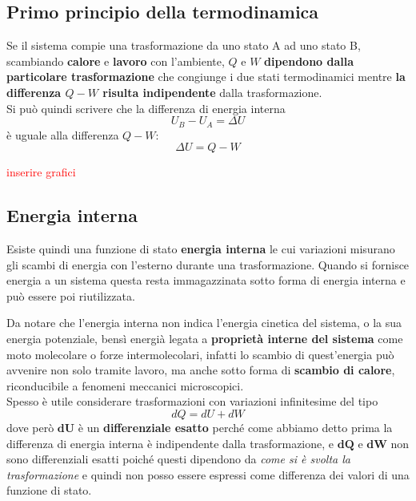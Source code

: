 \documentclass[x11names]{report}
\begin{document}
	
	\begin{center}
		\colorbox{yred}{\begin{minipage}{5.75in}
				\begin{redes}{}
					\subsection{Primo principio della termodinamica}
					Se il sistema compie una trasformazione da uno stato A ad uno stato B, scambiando \textbf{calore} e \textbf{lavoro} con l'ambiente, \(Q\) e \(W\) \textbf{dipendono dalla particolare trasformazione} che congiunge i due stati termodinamici mentre \textbf{la differenza \(Q-W\) risulta indipendente} dalla trasformazione.\\
					
					Si può quindi scrivere che la differenza di energia interna 
					\[ 
					U_B - U_A = \Delta U 
					\]
					è uguale alla differenza \(Q-W\):
					\begin{equation}\label{primoprincipio}
						\Delta U = Q -W
					\end{equation}
				\end{redes}
		\end{minipage}}
	\end{center}
	\begin{center}
		\textcolor{red}{inserire grafici}
	\end{center}
	
	\subsection{Energia interna}
	Esiste quindi una funzione di stato \textbf{energia interna} le cui variazioni misurano gli scambi di energia con l'esterno durante una trasformazione. Quando si fornisce energia a un sistema questa resta immagazzinata sotto forma di energia interna e può essere poi riutilizzata.
	
	Da notare che l'energia interna non indica l'energia cinetica del sistema, o la sua energia potenziale, bensì energià legata a \textbf{proprietà interne del sistema} come moto molecolare o forze intermolecolari, infatti lo scambio di quest'energia  può avvenire non solo tramite lavoro, ma anche sotto forma di \textbf{scambio di calore}, riconducibile a fenomeni meccanici microscopici.\\
	
	\noindent
	Spesso è utile considerare trasformazioni con variazioni infinitesime del tipo
	\[ 
	dQ = dU + dW
	\]
	dove però \(\boldsymbol{dU}\) è un \textbf{differenziale esatto} perché come abbiamo detto prima la differenza di energia interna è indipendente dalla trasformazione, e \(\boldsymbol{dQ}\) e \(\boldsymbol{dW}\) non sono differenziali esatti poiché questi dipendono da \textit{come si è svolta la trasformazione} e quindi non posso essere espressi come differenza dei valori di una funzione di stato.
	
\end{document}
